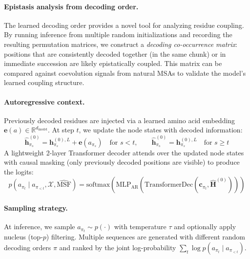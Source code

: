 \documentclass{article}
\begin{document}
\paragraph{Epistasis analysis from decoding order.} The learned decoding order provides a novel tool for analyzing residue coupling. By running inference from multiple random initializations and recording the resulting permutation matrices, we construct a \emph{decoding co-occurrence matrix}: positions that are consistently decoded together (in the same chunk) or in immediate succession are likely epistatically coupled. This matrix can be compared against coevolution signals from natural MSAs to validate the model's learned coupling structure.

\paragraph{Autoregressive context.} Previously decoded residues are injected via a learned amino acid embedding $\mathbf{e}(a) \in \mathbb{R}^{d_{\text{model}}}$. At step $t$, we update the node states with decoded information:
\begin{equation}
    \hat{\mathbf{h}}_{\pi_s}^{(0)} = \mathbf{h}_{\pi_s}^{(0),L} + \mathbf{e}(a_{\pi_s}) \quad \text{for } s < t, \qquad \hat{\mathbf{h}}_{\pi_s}^{(0)} = \mathbf{h}_{\pi_s}^{(0),L} \quad \text{for } s \geq t
\end{equation}
A lightweight 2-layer Transformer decoder attends over the updated node states with causal masking (only previously decoded positions are visible) to produce the logits:
\begin{equation}
    p(a_{\pi_t} \mid a_{\pi_{<t}}, \mathcal{X}, \widehat{\text{MSF}}) = \text{softmax}\left(\text{MLP}_{\text{AR}}\left(\text{TransformerDec}(\mathbf{c}_{\pi_t}, \hat{\mathbf{H}}^{(0)})\right)\right)
\end{equation}

\paragraph{Sampling strategy.} At inference, we sample $a_{\pi_t} \sim p(\cdot)$ with temperature $\tau$ and optionally apply nucleus (top-$p$) filtering. Multiple sequences are generated with different random decoding orders $\pi$ and ranked by the joint log-probability $\sum_t \log p(a_{\pi_t} \mid a_{\pi_{<t}})$.
\end{document}
